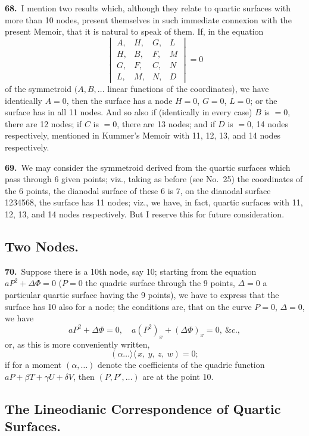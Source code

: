 \documentclass[11pt,a4paper]{article}
\newcommand{\bw}{\mathrel{\rangle\!\langle}}
\begin{document}
\noindent\textbf{68.}\ I mention two results which, although they relate to quartic surfaces with more than 10 nodes, present themselves in such immediate connexion with the present Memoir, that it is natural to speak of them. If, in the equation
\[
\begin{vmatrix}
A, & H, & G, & L\\
H, & B, & F, & M\\
G, & F, & C, & N\\
L, & M, & N, & D
\end{vmatrix} = 0
\]
of the symmetroid $(A, B, \ldots$ linear functions of the coordinates), we have identically $A = 0$, then the surface has a node $H = 0$, $G = 0$, $L = 0$; or the surface has in all 11 nodes. And so also if (identically in every case) $B$ is $= 0$, there are 12 nodes; if $C$ is $= 0$, there are 13 nodes; and if $D$ is $= 0$, 14 nodes respectively, mentioned in Kummer's Memoir with 11, 12, 13, and 14 nodes respectively.

\medskip

\textbf{69.}\ We may consider the symmetroid derived from the quartic surfaces which pass through 6 given points; viz., taking as before (see No.\ 25) the coordinates of the 6 points, the dianodal surface of these 6 is 7, on the dianodal surface 1234568, the surface has 11 nodes; viz., we have, in fact, quartic surfaces with 11, 12, 13, and 14 nodes respectively. But I reserve this for future consideration.

\subsection*{Two Nodes.}

\noindent\textbf{70.}\ Suppose there is a 10th node, say 10; starting from the equation $aP^2 + \Delta\Phi = 0$ ($P = 0$ the quadric surface through the 9 points, $\Delta = 0$ a particular quartic surface having the 9 points), we have to express that the surface has 10 also for a node; the conditions are, that on the curve $P = 0$, $\Delta = 0$, we have
\[
aP^2 + \Delta\Phi = 0,\quad a(P^2)_x + (\Delta\Phi)_x = 0,\ \&c.,
\]
or, as this is more conveniently written,
\[
(\alpha\ldots \bw\, x,\ y,\ z,\ w) = 0;
\]
if for a moment $(\alpha,\ldots)$ denote the coefficients of the quadric function $aP + \beta T + \gamma U + \delta V$, then $(P, P', \ldots)$ are at the point 10.

\newpage
\setcounter{page}{159}

\subsection*{The Lineodianic Correspondence of Quartic Surfaces.}
\end{document}
